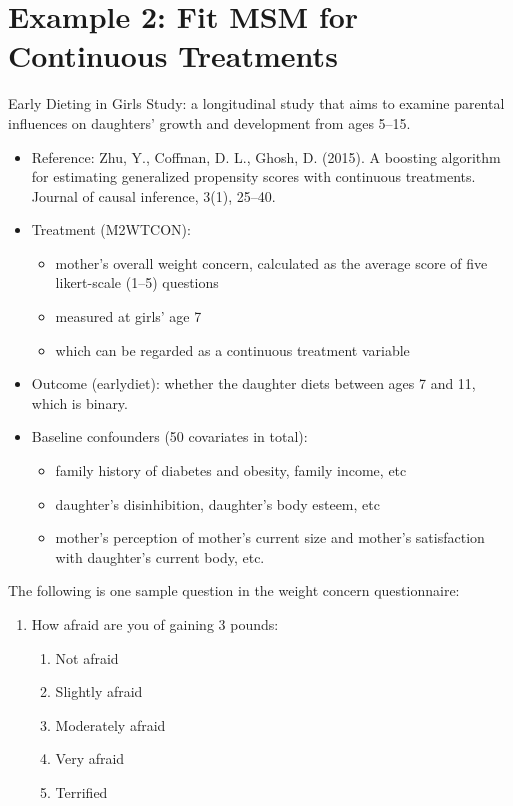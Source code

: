 \section{Example 2: Fit MSM for Continuous Treatments}
Early Dieting in Girls Study: a longitudinal study that aims to examine
parental influences on daughters' growth and development from ages 5--15.
\begin{itemize}
      \item Reference: Zhu, Y., Coffman, D. L., Ghosh, D. (2015). A boosting algorithm for estimating generalized propensity
            scores with continuous treatments. Journal of causal inference, 3(1), 25--40.
\end{itemize}
\begin{itemize}
      \item Treatment (M2WTCON):
            \begin{itemize}
                  \item mother's overall weight concern, calculated as the average
                        score of five likert-scale (1--5) questions
                  \item measured at girls' age 7
                  \item which can be regarded as a continuous treatment variable
            \end{itemize}
      \item Outcome (earlydiet): whether the daughter diets between
            ages 7 and 11, which is binary.
      \item Baseline confounders (50 covariates in total):
            \begin{itemize}
                  \item family history of diabetes and obesity, family income, etc
                  \item daughter's disinhibition, daughter's body esteem, etc
                  \item mother's perception of mother's current size and mother's
                        satisfaction with daughter's current body, etc.
            \end{itemize}
\end{itemize}
The following is one sample question in the weight concern
questionnaire:
\begin{enumerate}
      \item How afraid are you of gaining 3 pounds:
            \begin{enumerate}[(1)]
                  \item Not afraid
                  \item Slightly afraid
                  \item Moderately afraid
                  \item Very afraid
                  \item Terrified
            \end{enumerate}
\end{enumerate}
